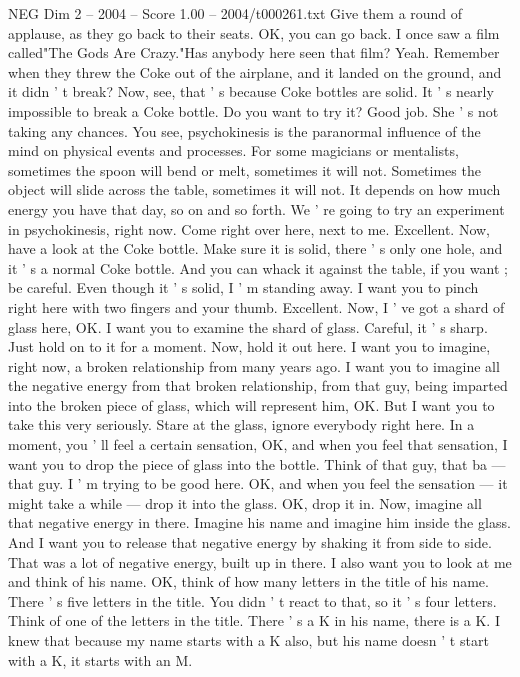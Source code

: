 \begin{textsample}{NEG Dim 2 – 2004 – Score 1.00 – 2004/t000261.txt}
Give them a round of applause, as they go back to their seats.
OK, you can go back.
I once saw a film called"The Gods Are Crazy."Has anybody here seen that film?
Yeah.
Remember when they threw the Coke out of the airplane, and it landed on the ground, and it didn ' t break?
Now, see, that ' s because Coke bottles are solid.
It ' s nearly impossible to break a Coke bottle.
Do you want to try it?
Good job.
She ' s not taking any chances.
You see, psychokinesis is the paranormal influence of the mind on physical events and processes.
For some magicians or mentalists, sometimes the spoon will bend or melt, sometimes it will not.
Sometimes the object will slide across the table, sometimes it will not.
It depends on how much energy you have that day, so on and so forth.
We ' re going to try an experiment in psychokinesis, right now.
Come right over here, next to me.
Excellent.
Now, have a look at the Coke bottle.
Make sure it is solid, there ' s only one hole, and it ' s a normal Coke bottle.
And you can whack it against the table, if you want ; be careful.
Even though it ' s solid, I ' m standing away.
I want you to pinch right here with two fingers and your thumb.
Excellent.
Now, I ' ve got a shard of glass here, OK.
I want you to examine the shard of glass.
Careful, it ' s sharp.
Just hold on to it for a moment.
Now, hold it out here.
I want you to imagine, right now, a broken relationship from many years ago.
I want you to imagine all the negative energy from that broken relationship, from that guy, being imparted into the broken piece of glass, which will represent him, OK.
But I want you to take this very seriously.
Stare at the glass, ignore everybody right here.
In a moment, you ' ll feel a certain sensation, OK, and when you feel that sensation, I want you to drop the piece of glass into the bottle.
Think of that guy, that ba — that guy.
I ' m trying to be good here.
OK, and when you feel the sensation — it might take a while — drop it into the glass.
OK, drop it in.
Now, imagine all that negative energy in there.
Imagine his name and imagine him inside the glass.
And I want you to release that negative energy by shaking it from side to side.
That was a lot of negative energy, built up in there.
I also want you to look at me and think of his name.
OK, think of how many letters in the title of his name.
There ' s five letters in the title.
You didn ' t react to that, so it ' s four letters.
Think of one of the letters in the title.
There ' s a K in his name, there is a K.
I knew that because my name starts with a K also, but his name doesn ' t start with a K, it starts with an M.

\end{textsample}
